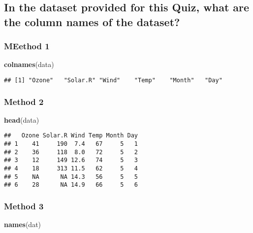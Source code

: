 \documentclass[]{article}
\newenvironment{Shaded}{\begin{snugshade}}{\end{snugshade}}
\newcommand{\KeywordTok}[1]{\textcolor[rgb]{0.13,0.29,0.53}{\textbf{#1}}}
\newcommand{\NormalTok}[1]{#1}
\begin{document}
\hypertarget{in-the-dataset-provided-for-this-quiz-what-are-the-column-names-of-the-dataset}{%
\subsection{In the dataset provided for this Quiz, what are the column
names of the
dataset?}\label{in-the-dataset-provided-for-this-quiz-what-are-the-column-names-of-the-dataset}}

\hypertarget{meethod-1}{%
\subsubsection{MEethod 1}\label{meethod-1}}

\begin{Shaded}
\begin{Highlighting}[]
\KeywordTok{colnames}\NormalTok{(data)}
\end{Highlighting}
\end{Shaded}

\begin{verbatim}
## [1] "Ozone"   "Solar.R" "Wind"    "Temp"    "Month"   "Day"
\end{verbatim}

\hypertarget{method-2}{%
\subsubsection{Method 2}\label{method-2}}

\begin{Shaded}
\begin{Highlighting}[]
\KeywordTok{head}\NormalTok{(data)}
\end{Highlighting}
\end{Shaded}

\begin{verbatim}
##   Ozone Solar.R Wind Temp Month Day
## 1    41     190  7.4   67     5   1
## 2    36     118  8.0   72     5   2
## 3    12     149 12.6   74     5   3
## 4    18     313 11.5   62     5   4
## 5    NA      NA 14.3   56     5   5
## 6    28      NA 14.9   66     5   6
\end{verbatim}

\hypertarget{method-3}{%
\subsubsection{Method 3}\label{method-3}}

\begin{Shaded}
\begin{Highlighting}[]
\KeywordTok{names}\NormalTok{(dat)}
\end{Highlighting}
\end{Shaded}
\end{document}

